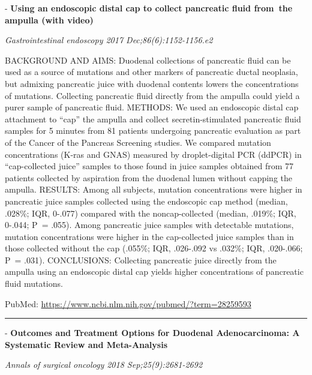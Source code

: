 \documentclass[]{article}
\begin{document}
 - \textbf{Using an endoscopic distal cap to collect pancreatic fluid
from~the ampulla (with video)}

\emph{Gastrointestinal endoscopy 2017 Dec;86(6):1152-1156.e2}

BACKGROUND AND AIMS: Duodenal collections of pancreatic fluid can be
used as a source of mutations and other markers of pancreatic ductal
neoplasia, but admixing pancreatic juice with duodenal contents lowers
the concentrations of mutations. Collecting pancreatic fluid directly
from the ampulla could yield a purer sample of pancreatic fluid.
METHODS: We used an endoscopic distal cap attachment to ``cap'' the
ampulla and collect secretin-stimulated pancreatic fluid samples for 5
minutes from 81 patients undergoing pancreatic evaluation as part of the
Cancer of the Pancreas Screening studies. We compared mutation
concentrations (K-ras and GNAS) measured by droplet-digital PCR (ddPCR)
in ``cap-collected juice'' samples to those found in juice samples
obtained from 77 patients collected by aspiration from the duodenal
lumen without capping the ampulla. RESULTS: Among all subjects, mutation
concentrations were higher in pancreatic juice samples collected using
the endoscopic cap method (median, .028\%; IQR, 0-.077) compared with
the noncap-collected (median, .019\%; IQR, 0-.044; P~= .055). Among
pancreatic juice samples with detectable mutations, mutation
concentrations were higher in the cap-collected juice samples than in
those collected without the cap (.055\%; IQR, .026-.092 vs .032\%; IQR,
.020-.066; P~= .031). CONCLUSIONS: Collecting pancreatic juice directly
from the ampulla using an endoscopic distal cap yields higher
concentrations of pancreatic fluid mutations.

PubMed: \url{https://www.ncbi.nlm.nih.gov/pubmed/?term=28259593}

{}

{}

\begin{center}\rule{0.5\linewidth}{\linethickness}\end{center}

 - \textbf{Outcomes and Treatment Options for Duodenal Adenocarcinoma: A
Systematic Review and Meta-Analysis}

\emph{Annals of surgical oncology 2018 Sep;25(9):2681-2692}
\end{document}
